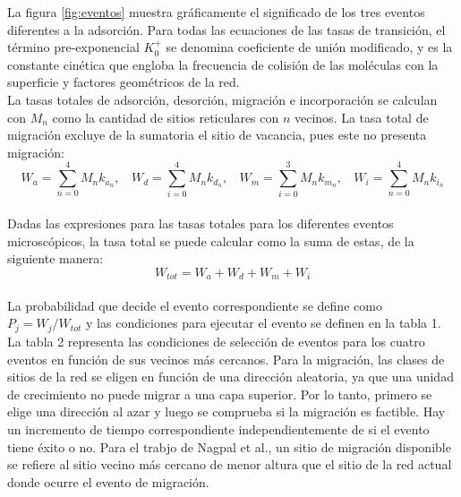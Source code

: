 \documentclass[12pt,letterpaper,oneside]{report}
\begin{document}
La figura \ref{fig:eventos} muestra gráficamente el significado de los tres eventos diferentes a la adsorción. Para todas las ecuaciones de las tasas de transición, el término pre-exponencial $K_0^+$  se denomina coeficiente de unión modificado, y es la constante cinética que engloba la frecuencia de colisión de las moléculas con la superficie y factores geométricos de la red.\\

La tasas totales de adsorción, desorción, migración e incorporación se calculan con $M_n$ como la cantidad de sitios reticulares con $n$ vecinos. La tasa total de migración excluye de la sumatoria el sitio de vacancia, pues este no presenta migración:\\

$$W_a = \sum_{n=0}^4M_nk_{a_n}, ~~~~ W_d = \sum_{i=0}^4M_nk_{d_n}, ~~~~ W_m = \sum_{i=0}^3M_nk_{m_n}, ~~~~ W_i = \sum_{n=0}^4M_nk_{i_n}$$\\

Dadas las expresiones para las tasas totales  para los diferentes eventos microscópicos, la tasa total se puede calcular como la suma de estas, de la siguiente manera:\\

\begin{equation}
    W_{tot} = W_a + W_d + W_m + W_i
\end{equation}\\

La probabilidad que decide el evento correspondiente se define como $P_j = W_j / W_{tot}$ y las condiciones para ejecutar el evento se definen en la tabla 1. La tabla 2 representa las condiciones de selección de eventos para los cuatro eventos en función de sus vecinos más cercanos. Para la migración, las clases de sitios de la red se eligen en función de una dirección aleatoria, ya que una unidad de crecimiento no puede migrar a una capa superior. Por lo tanto, primero se elige una dirección al azar y luego se comprueba si la migración es factible. Hay un incremento de tiempo correspondiente independientemente de si el evento tiene éxito o no. Para el trabjo de Nagpal et al., un sitio de migración disponible se refiere al sitio vecino más cercano de menor altura que el sitio de la red actual donde ocurre el evento de migración.\\
\end{document}
